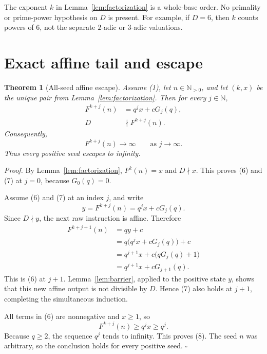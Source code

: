\documentclass[11pt,letterpaper]{article}
\newcommand{\N}{\mathbb{N}}
\newtheorem{theorem}{Theorem}
\newenvironment{proof}{\noindent\textit{Proof.}}{\hfill\(\square\)}
\begin{document}
The exponent \(k\) in Lemma~\ref{lem:factorization} is a whole-base order.
No primality or prime-power hypothesis on \(D\) is present. For example, if
\(D=6\), then \(k\) counts powers of \(6\), not the separate \(2\)-adic or
\(3\)-adic valuations.

\section{Exact affine tail and escape}

\begin{theorem}[All-seed affine escape]
\label{thm:escape}
Assume (1), let \(n\in\N_{>0}\), and let \((k,x)\) be the unique pair from
Lemma~\ref{lem:factorization}. Then for every \(j\in\N\),
\begin{align}
F^{k+j}(n)&=q^j x+cG_j(q),                                   \tag{6}\\
D&\nmid F^{k+j}(n).                                           \tag{7}
\end{align}
Consequently,
\[
F^{k+j}(n)\longrightarrow\infty
\qquad\text{as }j\longrightarrow\infty.                    \tag{8}
\]
Thus every positive seed escapes to infinity.
\end{theorem}

\begin{proof}
By Lemma~\ref{lem:factorization}, \(F^k(n)=x\) and \(D\nmid x\). This proves
(6) and (7) at \(j=0\), because \(G_0(q)=0\).

Assume (6) and (7) at an index \(j\), and write
\[
y=F^{k+j}(n)=q^j x+cG_j(q).
\]
Since \(D\nmid y\), the next raw instruction is affine. Therefore
\begin{align*}
F^{k+j+1}(n)
 &=qy+c\\
 &=q\bigl(q^j x+cG_j(q)\bigr)+c\\
 &=q^{j+1}x+c\bigl(qG_j(q)+1\bigr)\\
 &=q^{j+1}x+cG_{j+1}(q).
\end{align*}
This is (6) at \(j+1\). Lemma~\ref{lem:barrier}, applied to the positive
state \(y\), shows that this new affine output is not divisible by \(D\).
Hence (7) also holds at \(j+1\), completing the simultaneous induction.

All terms in (6) are nonnegative and \(x\ge1\), so
\[
F^{k+j}(n)\ge q^j x\ge q^j.
\]
Because \(q\ge2\), the sequence \(q^j\) tends to infinity. This proves (8).
The seed \(n\) was arbitrary, so the conclusion holds for every positive
seed.
\end{proof}
\end{document}
